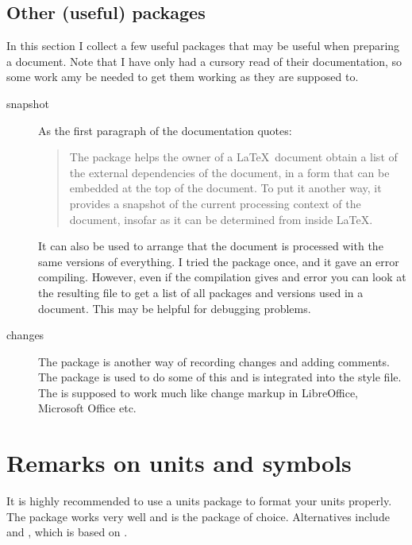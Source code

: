 \subsection{Other (useful) packages}

In this section I collect a few useful packages that may be useful when preparing a document.
Note that I have only had a cursory read of their documentation,
so some work amy be needed to get them working as they are supposed to.
\begin{description}
  \item[snapshot] As the first paragraph of the documentation quotes:
    \begin{quotation}
      The  package helps the owner of a \LaTeX\ document obtain a list of the external dependencies of the document,
      in a form that can be embedded at the top of the document.
      To put it another way, it provides a snapshot of the current processing context of the document,
      insofar as it can be determined from inside \LaTeX.
  \end{quotation}
  It can also be used to arrange that the document is processed with the same versions of everything.
  I tried the package once, and it gave an error compiling.
  However, even if the compilation gives and error
  you can look at the resulting  file to get a list of all packages and versions used in a document.
  This may be helpful for debugging problems.

  \item[changes] The  package is another way of recording changes and adding comments.
    The  package is used to do some of this and is integrated into the  style file.
    The  is supposed to work much like change markup in LibreOffice, Microsoft Office etc.
\end{description}


\section{Remarks on units and symbols}%
\label{sec:siunitx}

It is highly recommended to use a units package to format your units properly.
The package  works very well and is the package of choice.
Alternatives include  and ,
which is based on .

